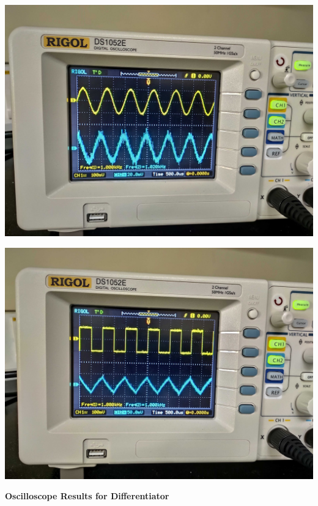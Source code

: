 \bigskip
\begin{center}
    \includegraphics[scale = 0.09]{Documents/Int. Sine.jpg}
\end{center}
\begin{center}
    \includegraphics[scale = 0.09]{Documents/Int. Square.jpg}
\end{center}
\bigskip
\begin{center}
    \textbf{Oscilloscope Results for Differentiator}
\end{center}
